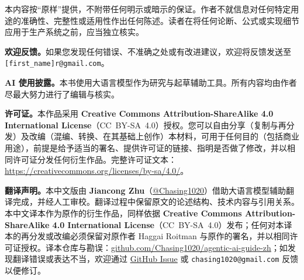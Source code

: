 \documentclass[11pt,a4paper,openany]{book}
\begin{document}
本内容按“原样”提供，不附带任何明示或暗示的保证。作者不就信息对任何特定用途的准确性、完整性或适用性作出任何陈述。读者在将任何论断、公式或实现细节应用于生产系统之前，应当独立核实。

\textbf{欢迎反馈。}如果您发现任何错误、不准确之处或有改进建议，欢迎将反馈发送至 \texttt{[first\_name]r@gmail.com}。

\textbf{AI 使用披露。}本书使用大语言模型作为研究与起草辅助工具。所有内容均由作者尽最大努力进行了编辑与核实。

\textbf{许可证。}本作品采用 \textbf{Creative Commons Attribution-ShareAlike 4.0 International License}（CC~BY-SA~4.0）授权。您可以自由分享（复制与再分发）及改编（混编、转换、在其基础上创作）本材料，可用于任何目的（包括商业用途），前提是给予适当的署名、提供许可证的链接、指明是否做了修改，并以相同许可证分发任何衍生作品。完整许可证文本：\href{https://creativecommons.org/licenses/by-sa/4.0/}{https://creativecommons.org/licenses/by-sa/4.0/}。

\textbf{翻译声明。}本中文版由 \textbf{Jiancong Zhu}（\href{https://github.com/Chasing1020}{@Chasing1020}）借助大语言模型辅助翻译完成，并经人工审校。翻译过程中保留原文的论述结构、技术内容与引用关系。本中文译本作为原作的衍生作品，同样依据 \textbf{Creative Commons Attribution-ShareAlike 4.0 International License}（CC~BY-SA~4.0）发布；任何对本译本的再分发或改编必须保留对原作者 Haggai Roitman 与原作的署名，并以相同许可证授权。译本仓库与勘误：\href{https://github.com/Chasing1020/agentic-ai-guide-zh}{github.com/Chasing1020/agentic-ai-guide-zh}；如发现翻译错误或表达不当，欢迎通过 \href{https://github.com/Chasing1020/agentic-ai-guide-zh/issues}{GitHub Issue} 或 \texttt{chasing1020@gmail.com} 反馈以便修订。
\end{document}
